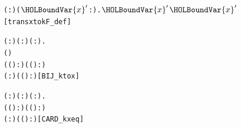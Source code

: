 \documentclass{article}
\begin{document}
\begin{alltt}
\HOLTokenTurnstile{} \HOLSymConst{\HOLTokenForall{}}( :) (\ensuremath{\HOLBoundVar{x}\sp{\prime{}}} :).   \ensuremath{\HOLBoundVar{x}\sp{\prime{}}} \HOLSymConst{=}  \HOLSymConst{\HOLTokenEor{}} \ensuremath{\HOLBoundVar{x}\sp{\prime{}}}\hfill{[transxtokF_def]}
\end{alltt}

\begin{alltt}
\HOLTokenTurnstile{} \HOLSymConst{\HOLTokenForall{}}( :) ( :) ( :).
      ( )
       \HOLTokenLeftbrace{} \HOLTokenBar{} ( ( \HOLSymConst{\HOLTokenEor{}} ) :) \HOLSymConst{\HOLTokenEor{}} ( ( \HOLSymConst{\HOLTokenEor{}}  \HOLSymConst{\HOLTokenEor{}}  ) :) \HOLSymConst{=} \HOLTokenRightbrace{}
       \HOLTokenLeftbrace{} \HOLTokenBar{} (  :) \HOLSymConst{\HOLTokenEor{}} ( ( \HOLSymConst{\HOLTokenEor{}}  ) :) \HOLSymConst{=} \HOLTokenRightbrace{}\hfill{[BIJ_ktox]}
\end{alltt}

\begin{alltt}
\HOLTokenTurnstile{} \HOLSymConst{\HOLTokenForall{}}( :) ( :) ( :).
       \HOLTokenLeftbrace{} \HOLTokenBar{} ( ( \HOLSymConst{\HOLTokenEor{}} ) :) \HOLSymConst{\HOLTokenEor{}} ( ( \HOLSymConst{\HOLTokenEor{}}  \HOLSymConst{\HOLTokenEor{}}  ) :) \HOLSymConst{=} \HOLTokenRightbrace{} \HOLSymConst{=}
      \HOLTokenLeftbrace{} \HOLTokenBar{} (  :) \HOLSymConst{\HOLTokenEor{}} ( ( \HOLSymConst{\HOLTokenEor{}}  ) :) \HOLSymConst{=} \HOLTokenRightbrace{}\hfill{[CARD_kxeq]}
\end{alltt}
\end{document}
